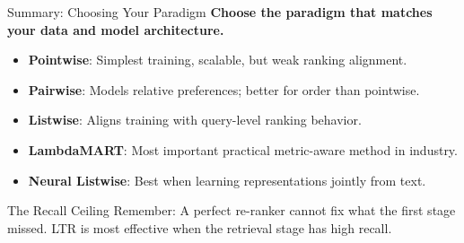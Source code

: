 \documentclass[aspectratio=169]{beamer}
\newif\ifanimated
\newcommand{\cpause}{\ifanimated\pause\fi}
\begin{document}
\begin{frame}{Summary: Choosing Your Paradigm}
\textbf{Choose the paradigm that matches your data and model architecture.}

\vspace{0.8em}
\begin{itemize}
  \item \textbf{Pointwise}: Simplest training, scalable, but weak ranking alignment.
  \item \textbf{Pairwise}: Models relative preferences; better for order than pointwise.
  \item \textbf{Listwise}: Aligns training with query-level ranking behavior.
  \item \textbf{LambdaMART}: Most important practical metric-aware method in industry.
  \item \textbf{Neural Listwise}: Best when learning representations jointly from text.
\end{itemize}\cpause

\vspace{1em}
\cpause
\begin{alertblock}{The Recall Ceiling}
Remember: A perfect re-ranker cannot fix what the first stage missed. LTR is most effective when the retrieval stage has high recall.
\end{alertblock}
\end{frame}



\appendix
\end{document}
